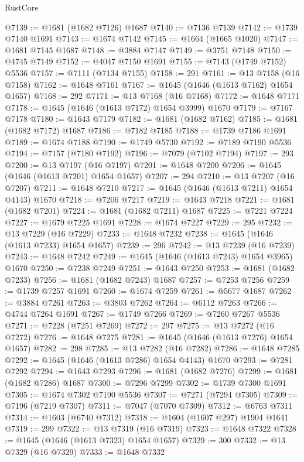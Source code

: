 \begin{lexlean}{RustCore}
\begin{coremodule}
@7139 := @1681 (@1682 @7126) @1687
@7140 := @7136 @7139
@7142 := @1739 @7140 @1691
@7143 := @1674 @7142
@7145 := @1664 (@1665 @1020)
@7147 := @1681 @7145 @1687
@7148 := @3884 @7147
@7149 := @3751 @7148
@7150 := @4745 @7149
@7152 := @4047 @7150 @1691
@7155 := @7143 (@1749 @7152) @5536
@7157 := @7111 (@7134 @7155)
@7158 := 291
@7161 := @13 @7158 (@16 @7158)
@7162 := @1648 @7161
@7167 := @1645 (@1646 (@1613 @7162) @1654 @1657)
@7168 := 292
@7171 := @13 @7168 (@16 @7168)
@7172 := @1648 @7171
@7178 := @1645 (@1646 (@1613 @7172) @1654 @3999) @1670
@7179 := @7167 @7178
@7180 := @1643 @7179
@7182 := @1681 (@1682 @7162)
@7185 := @1681 (@1682 @7172) @1687
@7186 := @7182 @7185
@7188 := @1739 @7186 @1691
@7189 := @1674 @7188
@7190 := @1749 @5730
@7192 := @7189 @7190 @5536
@7194 := @7157 (@7180 @7192)
@7196 := @7079 (@7102 @7194)
@7197 := 293
@7200 := @13 @7197 (@16 @7197)
@7201 := @1648 @7200
@7206 := @1645 (@1646 (@1613 @7201) @1654 @1657)
@7207 := 294
@7210 := @13 @7207 (@16 @7207)
@7211 := @1648 @7210
@7217 := @1645 (@1646 (@1613 @7211) @1654 @4143) @1670
@7218 := @7206 @7217
@7219 := @1643 @7218
@7221 := @1681 (@1682 @7201)
@7224 := @1681 (@1682 @7211) @1687
@7225 := @7221 @7224
@7227 := @1679 @7225 @1691
@7228 := @1674 @7227
@7229 := 295
@7232 := @13 @7229 (@16 @7229)
@7233 := @1648 @7232
@7238 := @1645 (@1646 (@1613 @7233) @1654 @1657)
@7239 := 296
@7242 := @13 @7239 (@16 @7239)
@7243 := @1648 @7242
@7249 := @1645 (@1646 (@1613 @7243) @1654 @3965) @1670
@7250 := @7238 @7249
@7251 := @1643 @7250
@7253 := @1681 (@1682 @7233)
@7256 := @1681 (@1682 @7243) @1687
@7257 := @7253 @7256
@7259 := @1739 @7257 @1691
@7260 := @1674 @7259
@7261 := @5677 @1687
@7262 := @3884 @7261
@7263 := @3803 @7262
@7264 := @6112 @7263
@7266 := @4744 @7264 @1691
@7267 := @1749 @7266
@7269 := @7260 @7267 @5536
@7271 := @7228 (@7251 @7269)
@7272 := 297
@7275 := @13 @7272 (@16 @7272)
@7276 := @1648 @7275
@7281 := @1645 (@1646 (@1613 @7276) @1654 @1657)
@7282 := 298
@7285 := @13 @7282 (@16 @7282)
@7286 := @1648 @7285
@7292 := @1645 (@1646 (@1613 @7286) @1654 @4143) @1670
@7293 := @7281 @7292
@7294 := @1643 @7293
@7296 := @1681 (@1682 @7276)
@7299 := @1681 (@1682 @7286) @1687
@7300 := @7296 @7299
@7302 := @1739 @7300 @1691
@7305 := @1674 @7302 @7190 @5536
@7307 := @7271 (@7294 @7305)
@7309 := @7196 (@7219 @7307)
@7311 := @7047 (@7070 @7309)
@7312 := @6763 @7311
@7314 := @1603 (@6740 @7312)
@7318 := @1604 (@1607 @297) @1904 @1641
@7319 := 299
@7322 := @13 @7319 (@16 @7319)
@7323 := @1648 @7322
@7328 := @1645 (@1646 (@1613 @7323) @1654 @1657)
@7329 := 300
@7332 := @13 @7329 (@16 @7329)
@7333 := @1648 @7332

\end{coremodule}
\end{lexlean}
